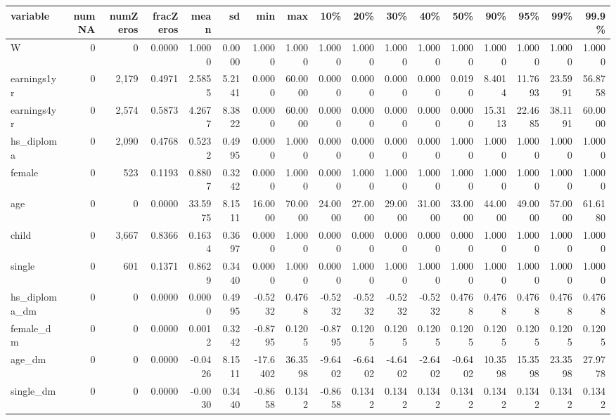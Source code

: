 
\begin{tabular}{lrrrrrrrrrrrrrrrr}
\toprule
variable & numNA & numZeros & fracZeros & mean & sd & min & max & 10\% & 20\% & 30\% & 40\% & 50\% & 90\% & 95\% & 99\% & 99.9\%\\
\midrule
W & 0 & 0 & 0.0000 & 1.0000 & 0.0000 & 1.0000 & 1.0000 & 1.0000 & 1.0000 & 1.0000 & 1.0000 & 1.0000 & 1.0000 & 1.0000 & 1.0000 & 1.0000\\
earnings1yr & 0 & 2,179 & 0.4971 & 2.5855 & 5.2141 & 0.0000 & 60.0000 & 0.0000 & 0.0000 & 0.0000 & 0.0000 & 0.0190 & 8.4014 & 11.7693 & 23.5991 & 56.8758\\
earnings4yr & 0 & 2,574 & 0.5873 & 4.2677 & 8.3822 & 0.0000 & 60.0000 & 0.0000 & 0.0000 & 0.0000 & 0.0000 & 0.0000 & 15.3113 & 22.4685 & 38.1191 & 60.0000\\
hs\_diploma & 0 & 2,090 & 0.4768 & 0.5232 & 0.4995 & 0.0000 & 1.0000 & 0.0000 & 0.0000 & 0.0000 & 0.0000 & 1.0000 & 1.0000 & 1.0000 & 1.0000 & 1.0000\\
female & 0 & 523 & 0.1193 & 0.8807 & 0.3242 & 0.0000 & 1.0000 & 0.0000 & 1.0000 & 1.0000 & 1.0000 & 1.0000 & 1.0000 & 1.0000 & 1.0000 & 1.0000\\
\addlinespace
age & 0 & 0 & 0.0000 & 33.5975 & 8.1511 & 16.0000 & 70.0000 & 24.0000 & 27.0000 & 29.0000 & 31.0000 & 33.0000 & 44.0000 & 49.0000 & 57.0000 & 61.6180\\
child & 0 & 3,667 & 0.8366 & 0.1634 & 0.3697 & 0.0000 & 1.0000 & 0.0000 & 0.0000 & 0.0000 & 0.0000 & 0.0000 & 1.0000 & 1.0000 & 1.0000 & 1.0000\\
single & 0 & 601 & 0.1371 & 0.8629 & 0.3440 & 0.0000 & 1.0000 & 0.0000 & 1.0000 & 1.0000 & 1.0000 & 1.0000 & 1.0000 & 1.0000 & 1.0000 & 1.0000\\
hs\_diploma\_dm & 0 & 0 & 0.0000 & 0.0000 & 0.4995 & -0.5232 & 0.4768 & -0.5232 & -0.5232 & -0.5232 & -0.5232 & 0.4768 & 0.4768 & 0.4768 & 0.4768 & 0.4768\\
female\_dm & 0 & 0 & 0.0000 & 0.0012 & 0.3242 & -0.8795 & 0.1205 & -0.8795 & 0.1205 & 0.1205 & 0.1205 & 0.1205 & 0.1205 & 0.1205 & 0.1205 & 0.1205\\
\addlinespace
age\_dm & 0 & 0 & 0.0000 & -0.0426 & 8.1511 & -17.6402 & 36.3598 & -9.6402 & -6.6402 & -4.6402 & -2.6402 & -0.6402 & 10.3598 & 15.3598 & 23.3598 & 27.9778\\
single\_dm & 0 & 0 & 0.0000 & -0.0030 & 0.3440 & -0.8658 & 0.1342 & -0.8658 & 0.1342 & 0.1342 & 0.1342 & 0.1342 & 0.1342 & 0.1342 & 0.1342 & 0.1342\\
\bottomrule
\end{tabular}
